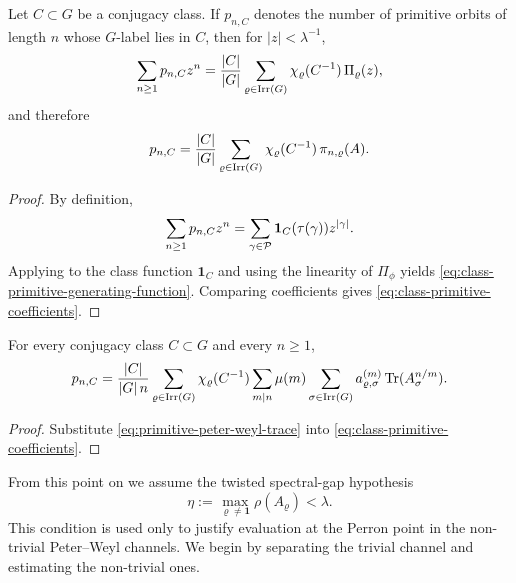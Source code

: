 \begin{proposition}
  \label{thm:class-primitive-decomposition}
  Let \(C\subset G\) be a conjugacy class. If \(p_{n,C}\) denotes the
  number of primitive orbits of length \(n\) whose \(G\)-label lies in
  \(C\), then for \(|z|<\lambda^{-1}\),
  \begin{equation}\label{eq:class-primitive-generating-function}
    \sum_{n\ge 1}p_{n,C}z^n
    =
    \frac{|C|}{|G|}
      \sum_{\varrho\in\operatorname{Irr}(G)}
        \chi_\varrho(C^{-1})\,\Pi_\varrho(z),
  \end{equation}
  and therefore
  \begin{equation}\label{eq:class-primitive-coefficients}
    p_{n,C}
    =
    \frac{|C|}{|G|}
      \sum_{\varrho\in\operatorname{Irr}(G)}
        \chi_\varrho(C^{-1})\,\pi_{n,\varrho}(A).
  \end{equation}
\end{proposition}

\begin{proof}
  By definition,
  \[
    \sum_{n\ge 1}p_{n,C}z^n
    =
    \sum_{\gamma\in\mathcal P}\mathbf 1_C(\tau(\gamma))z^{|\gamma|}.
  \]
  Applying  to the class function
  \(\mathbf 1_C\) and using the linearity of \(\Pi_\phi\) yields
  \eqref{eq:class-primitive-generating-function}. Comparing coefficients
  gives \eqref{eq:class-primitive-coefficients}.
\end{proof}

\begin{corollary}
  \label{cor:class-artin-mobius-trace}
  For every conjugacy class \(C\subset G\) and every \(n\ge 1\),
  \begin{equation}\label{eq:class-artin-mobius-trace}
    p_{n,C}
    =
    \frac{|C|}{|G|\,n}
      \sum_{\varrho\in\operatorname{Irr}(G)}
        \chi_\varrho(C^{-1})
        \sum_{m\mid n}\mu(m)
          \sum_{\sigma\in\operatorname{Irr}(G)}
            a_{\varrho,\sigma}^{(m)}
            \operatorname{Tr}(A_\sigma^{n/m}).
  \end{equation}
\end{corollary}

\begin{proof}
  Substitute \eqref{eq:primitive-peter-weyl-trace} into
  \eqref{eq:class-primitive-coefficients}.
\end{proof}

From this point on we assume the twisted spectral-gap hypothesis
\[
  \eta:=\max_{\varrho\neq\mathbf 1}\rho(A_\varrho)<\lambda.
\]
This condition is used only to justify evaluation at the Perron point in
the non-trivial Peter--Weyl channels. We begin by separating the trivial
channel and estimating the non-trivial ones.

